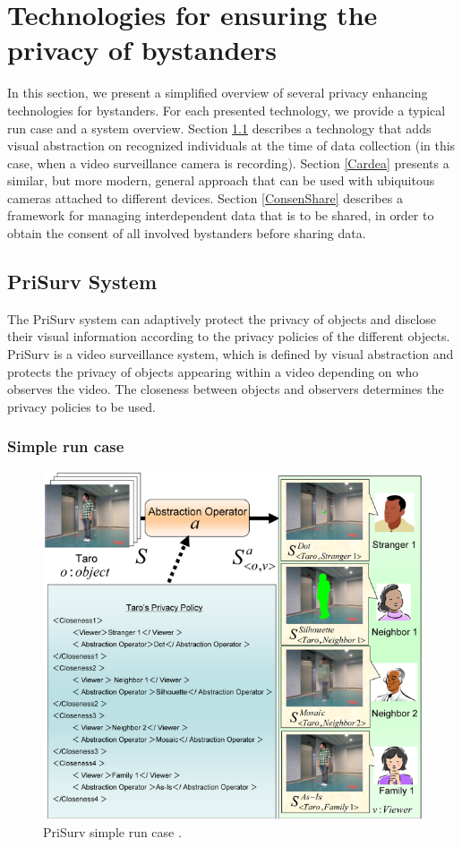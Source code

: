 \documentclass[conference, 11pt]{IEEEtran}
\begin{document}
\section{Technologies for ensuring the privacy of bystanders}\label{Technologies}
In this section, we present a simplified overview of several privacy enhancing technologies for bystanders. For each presented technology, we provide a typical run case and a system overview. Section \ref{PrivSurv} describes a technology that adds visual abstraction on recognized individuals at the time of data collection (in this case, when a video surveillance camera is recording).  Section \ref{Cardea} presents a similar, but more modern, general approach that can be used with ubiquitous cameras attached to different devices. Section \ref{ConsenShare} describes a framework for managing interdependent data that is to be shared, in order to obtain the consent of all involved bystanders before sharing data.

\subsection{PriSurv System}\label{PrivSurv}
The PriSurv system \cite{chinomi2008PriSurv} can adaptively protect the privacy of objects and disclose their visual information according to the privacy policies of the different objects. PriSurv is a video surveillance system, which is defined by visual abstraction and protects the privacy of objects appearing within a video depending on who observes the video. The closeness between objects and observers determines the privacy policies to be used. 

\subsubsection{Simple run case}

\begin{figure}[t]
\centerline{\includegraphics[width=.5\textwidth]{img//prisurv_simple_demo.png}}
\caption{PriSurv simple run case \cite{chinomi2008PriSurv}.}
\label{fig:prisurv}
\end{figure}
\end{document}
